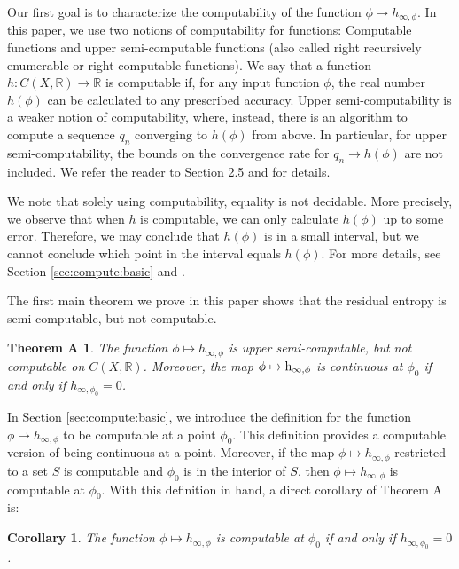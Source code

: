 \documentclass[11pt, reqno]{amsart}
\newtheorem{corollary}[theorem]{Corollary}
\newcommand{\bR}{{\mathbb R}}
\def\h{{\text h}}
\newtheorem*{thmA}{Theorem A}
\begin{document}
Our first goal is to characterize the computability of the function $\phi\mapsto h_{\infty,\phi}$.  In this paper, we use two notions of computability for functions: Computable functions and upper semi-computable functions (also called right recursively enumerable or right computable functions).  We say that a function $h:C(X,\bR)\to \bR$ is computable if, for any input function $\phi$, the real number $h(\phi)$ can be calculated to any prescribed accuracy.  Upper semi-computability is a weaker notion of computability, where, instead, there is an algorithm to compute a sequence $q_n$ converging to $h(\phi)$ from above.  In particular, for upper semi-computability, the bounds on the convergence rate for $q_n\rightarrow h(\phi)$ are not included. We refer the reader to Section 2.5 and \cite{BY,GHR} for details.

We note that solely using computability, equality is not decidable.  More precisely, we observe that when $h$ is computable, we can only calculate $h(\phi)$ up to some error.  Therefore, we may conclude that $h(\phi)$ is in a small interval, but we cannot conclude which point in the interval equals $h(\phi)$.  For more details, see Section \ref{sec:compute:basic} and \cite{Sp,Yap:Zero}.

The first main theorem we prove in this paper shows that the residual entropy is semi-computable, but not  computable.

\begin{thmA}
The function $\phi\mapsto h_{\infty,\phi}$ is upper semi-computable, but not computable on $C(X,\bR)$.  Moreover, the map $\phi\mapsto\h_{\infty,\phi}$ is continuous at $\phi_0$ if and only if $h_{\infty,\phi_0}=0$.
\end{thmA}

In Section \ref{sec:compute:basic}, we introduce the definition for the function $\phi\mapsto h_{\infty,\phi}$ to be computable at a point $\phi_0$.  This definition provides a computable version of being continuous at a point.  Moreover, if the map $\phi\mapsto h_{\infty,\phi}$ restricted to a set $S$ is computable and $\phi_0$ is in the interior of $S$, then $\phi\mapsto h_{\infty,\phi}$ is computable at $\phi_0$.  With this definition in hand, a direct corollary of Theorem A is: 

\begin{corollary}\label{cor:computabilityentropy}
The function $\phi\mapsto h_{\infty,\phi}$ is computable at $\phi_0$ if and only if $h_{\infty,\phi_0}=0$.
\end{corollary}
\end{document}
